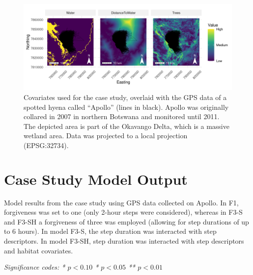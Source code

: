 \documentclass[../FinalThesis.tex]{subfiles}
\begin{document}
\begin{figure}[!ht]
  \begin{center}
  \includegraphics[width = \textwidth]{Figures/CaseStudyCovariates.png}
  \caption{Covariates used for the case study, overlaid with the GPS data of a
  spotted hyena called ``Apollo'' (lines in black). Apollo was originally
  collared in 2007 in northern Botswana and monitored until 2011. The depicted
  area is part of the Okavango Delta, which is a massive wetland area. Data was
  projected to a local projection (EPSG:32734).}
  \label{CaseStudyCovariates}
  \end{center}
\end{figure}

\newpage
\section{Case Study Model Output}

\begin{table}[!ht]
  \begin{center}
  \caption{Model results from the case study using GPS data collected on Apollo.
  In F1, forgiveness was set to one (only 2-hour steps were considered), whereas
  in F3-S and F3-SH a forgiveness of three was employed (allowing for step
  durations of up to 6 hours). In model F3-S, the step duration was interacted
  with step descriptors. In model F3-SH, step duration was interacted with step
  descriptors and habitat covariates.}
  \label{CaseStudyTable}
    \begin{adjustbox}{max width=0.65\textwidth}
    \begin{threeparttable}[h]
      
      \begin{tablenotes}
       \item \textit{Significance codes: * \(p < 0.10\) \quad ** \(p < 0.05\)
        \quad *** \(p < 0.01\)}
      \end{tablenotes}
    \end{threeparttable}
  \end{adjustbox}
  \end{center}
\end{table}

\end{document}
